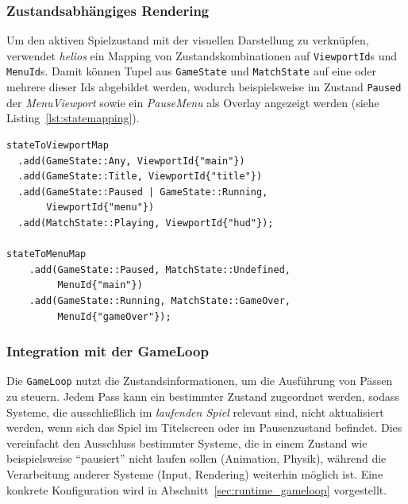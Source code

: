 \subsubsection{Zustandsabhängiges Rendering}

Um den aktiven Spielzustand mit der visuellen Darstellung zu verknüpfen, verwendet \textit{helios} ein Mapping von Zustandskombinationen auf \texttt{ViewportId}s und \texttt{MenuId}s.
Damit können Tupel aus \texttt{GameState} und \texttt{MatchState} auf eine oder mehrere dieser Ids abgebildet werden, wodurch beispielsweise im Zustand \texttt{Paused} der \textit{MenuViewport} sowie ein \textit{PauseMenu} als Overlay angezeigt werden (siehe Listing~\ref{lst:statemapping}).

\vspace{5mm}
\begin{lstlisting}[style=c++style,
    caption={Codeausschnitt aus der \textit{Scoring Demo}, der die Konfiguration zustandsspezifischer Anzeigen demonstriert.},
    label=lst:statemapping]
stateToViewportMap
  .add(GameState::Any, ViewportId{"main"})
  .add(GameState::Title, ViewportId{"title"})
  .add(GameState::Paused | GameState::Running,
       ViewportId{"menu"})
  .add(MatchState::Playing, ViewportId{"hud"});

stateToMenuMap
    .add(GameState::Paused, MatchState::Undefined,
         MenuId{"main"})
    .add(GameState::Running, MatchState::GameOver,
         MenuId{"gameOver"});
\end{lstlisting}
\vspace{5mm}

\subsubsection{Integration mit der GameLoop}

Die \texttt{GameLoop} nutzt die Zustandsinformationen, um die Ausführung von Pässen zu steuern.
Jedem Pass kann ein bestimmter Zustand zugeordnet werden, sodass Systeme, die ausschließlich im \textit{laufenden Spiel} relevant sind, nicht aktualisiert werden, wenn sich das Spiel im Titelscreen oder im Pausenzustand befindet.
Dies vereinfacht den Ausschluss bestimmter Systeme, die in einem Zustand wie beispielsweise ``pausiert'' nicht laufen sollen (Animation, Physik), während die Verarbeitung anderer Systeme (Input, Rendering) weiterhin möglich ist.
Eine konkrete Konfiguration wird in Abschnitt~\ref{sec:runtime_gameloop} vorgestellt.